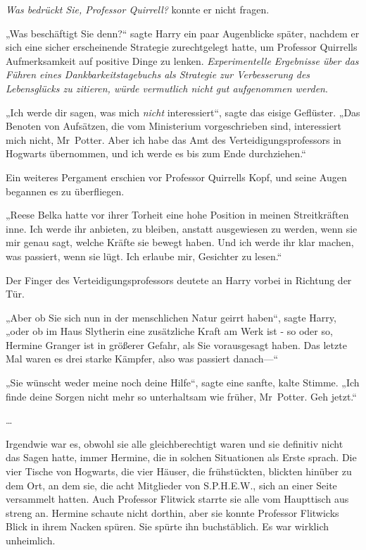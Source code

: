 {\emph{Was bedrückt Sie, Professor Quirrell?} konnte er nicht fragen.

„Was beschäftigt Sie denn?“ sagte Harry ein paar Augenblicke später, nachdem er sich eine sicher erscheinende Strategie zurechtgelegt hatte, um Professor Quirrells Aufmerksamkeit auf positive Dinge zu lenken. \emph{Experimentelle Ergebnisse über das Führen eines Dankbarkeitstagebuchs als Strategie zur Verbesserung des Lebensglücks zu zitieren, würde vermutlich nicht gut aufgenommen werden}.

„Ich werde dir sagen, was mich \emph{nicht} interessiert“, sagte das eisige Geflüster. „Das Benoten von Aufsätzen, die vom Ministerium vorgeschrieben sind, interessiert mich nicht, Mr~Potter. Aber ich habe das Amt des Verteidigungsprofessors in Hogwarts übernommen, und ich werde es bis zum Ende durchziehen.“

Ein weiteres Pergament erschien vor Professor Quirrells Kopf, und seine Augen begannen es zu überfliegen.

„Reese Belka hatte vor ihrer Torheit eine hohe Position in meinen Streitkräften inne. Ich werde ihr anbieten, zu bleiben, anstatt ausgewiesen zu werden, wenn sie mir genau sagt, welche Kräfte sie bewegt haben. Und ich werde ihr klar machen, was passiert, wenn sie lügt. Ich erlaube mir, Gesichter zu lesen.“

Der Finger des Verteidigungsprofessors deutete an Harry vorbei in Richtung der Tür.

„Aber ob Sie sich nun in der menschlichen Natur geirrt haben“, sagte Harry, „oder ob im Haus Slytherin eine zusätzliche Kraft am Werk ist - so oder so, Hermine Granger ist in größerer Gefahr, als Sie vorausgesagt haben. Das letzte Mal waren es drei starke Kämpfer, also was passiert danach—“

„Sie wünscht weder meine noch deine Hilfe“, sagte eine sanfte, kalte Stimme. „Ich finde deine Sorgen nicht mehr so unterhaltsam wie früher, Mr~Potter. Geh jetzt.“

…

Irgendwie war es, obwohl sie alle gleichberechtigt waren und sie definitiv nicht das Sagen hatte, immer Hermine, die in solchen Situationen als Erste sprach. Die vier Tische von Hogwarts, die vier Häuser, die frühstückten, blickten hinüber zu dem Ort, an dem sie, die acht Mitglieder von S.P.H.E.W., sich an einer Seite versammelt hatten. Auch Professor Flitwick starrte sie alle vom Haupttisch aus streng an. Hermine schaute nicht dorthin, aber sie konnte Professor Flitwicks Blick in ihrem Nacken spüren. Sie spürte ihn buchstäblich. Es war wirklich unheimlich.

}
